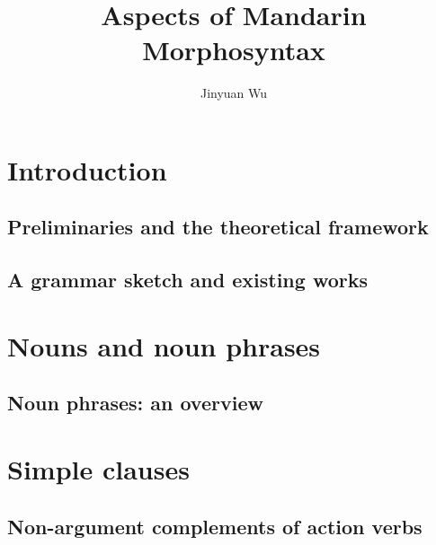 \documentclass[UTF8, a4paper, oneside, scheme=plain]{ctexbook}
\title{Aspects of Mandarin Morphosyntax}
\author{Jinyuan Wu}
\numberwithin{equation}{chapter}
\numberwithin{equation}{chapter}
\begin{document}
\maketitle

\part{Introduction}

\chapter{Preliminaries and the theoretical framework}



\chapter{A grammar sketch and existing works}





\part{Nouns and noun phrases}

\chapter{Noun phrases: an overview}



\part{Simple clauses}

\chapter{Non-argument complements of action verbs}






\printindex
\end{document}
